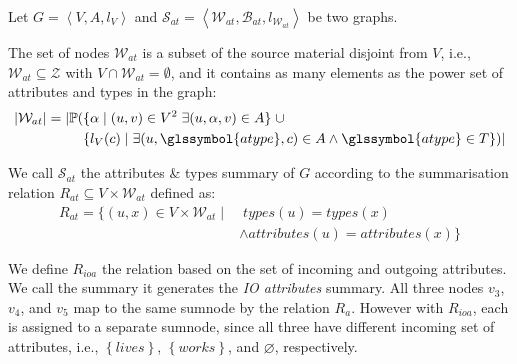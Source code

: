 \begin{definition}
	Let $G=\left\langle V, A, l_V \right\rangle$ and $\mathcal{S}_{at} = \left\langle \mathcal{W}_{at}, \mathcal{B}_{at}, l_{\mathcal{W}_{at}} \right\rangle$ be two graphs.

	The set of nodes $\mathcal{W}_{at}$ is a subset of the source material disjoint from $V$, i.e., $\mathcal{W}_{at} \subseteq \mathcal{Z}$ with $V \cap \mathcal{W}_{at} = \emptyset$, and it contains as many elements as the power set of attributes and types in the graph:
	$$
	\begin{aligned}
	\lvert \mathcal{W}_{at} \rvert = \lvert \mathbb{P} ( & \{ \alpha \mid (u, v) \in V^2\; \exists (u, \alpha, v) \in A \} \;\cup \\
	& \{ l_V(c) \mid \exists (u, \glssymbol{atype}, c) \in A \wedge \glssymbol{atype} \in T \} ) \rvert
	\end{aligned}
	$$

	We call $\mathcal{S}_{at}$ the attributes \& types summary of $G$ according to the summarisation relation $R_{at} \subseteq V \times \mathcal{W}_{at}$ defined as:
	$$
	\begin{aligned}
	R_{at} = \{ (u, x) \in V \times \mathcal{W}_{at} \mid &\; types(u) = types(x) \\
	& \wedge attributes(u) = attributes(x) \}
	\end{aligned}
	$$
	\label{def:at}
\end{definition}


We define $R_{ioa}$ the relation based on the set of incoming and outgoing attributes. We call the summary it generates the \emph{IO attributes} summary.
All three nodes $v_3$, $v_4$, and $v_5$ map to the same sumnode by the relation $R_a$. However with $R_{ioa}$, each is assigned to a separate sumnode, since all three have different incoming set of attributes, i.e., $\left\lbrace lives \right\rbrace$, $\left\lbrace works \right\rbrace$, and $\varnothing$, respectively.

